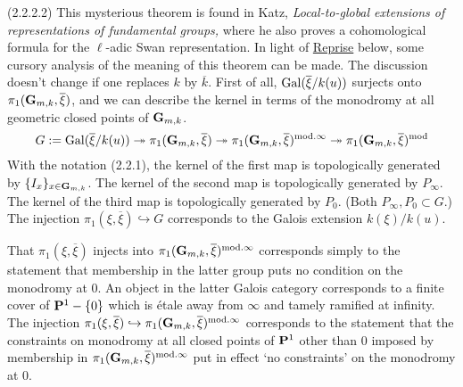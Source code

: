 \documentclass[deligne.tex]{subfiles}
\begin{document}
(2.2.2.2) This mysterious theorem is found in Katz,
\emph{Local-to-global extensions of representations of fundamental groups,}
where he also proves a cohomological formula for the $\ell$-adic Swan
representation.
In light of \hyperref[laumon:reprise]{Reprise} below, some cursory analysis
of the meaning of this theorem can be made.
The discussion doesn't change if one replaces $k$ by $\overline k$.
First of all, $\operatorname{Gal}(\overline\xi/k(u))$ surjects onto
$\pi_1(\mathbf{G}_{m,k},\overline\xi)$, and we can describe the kernel in terms of
the monodromy at all geometric closed points of $\mathbf{G}_{m,k}$.
\begin{equation*}
	G:=\operatorname{Gal}(\overline\xi/k(u))
	\twoheadrightarrow\pi_1(\mathbf{G}_{m,k},\overline\xi)
	\twoheadrightarrow\pi_1(\mathbf{G}_{m,k},\overline\xi)^{\mathrm{mod}.\infty}
	\twoheadrightarrow\pi_1(\mathbf{G}_{m,k},\overline\xi)^{\mathrm{mod}}
\end{equation*}
With the notation (2.2.1),
the kernel of the first map is topologically generated by
$\{I_x\}_{x\in\mathbf{G}_{m,k}}$.
The kernel of the second map is topologically generated by $P_{\infty}$.
The kernel of the third map is topologically generated by $P_0$.
(Both $P_\infty,P_0\subset G$.)
The injection $\pi_1(\xi,\overline\xi)\hookrightarrow G$ corresponds to the
Galois extension $k(\xi)/k(u)$.

That $\pi_1(\xi,\overline\xi)$ injects into
$\pi_1(\mathbf{G}_{m,k},\overline\xi)^{\mathrm{mod}.\infty}$
corresponds simply to the statement that membership in the latter group
puts no condition on the monodromy at 0. An object in the latter Galois
category corresponds to a finite cover of $\mathbf{P}^1-\{0\}$ which is étale away
from $\infty$ and tamely ramified at infinity. The injection
$\pi_1(\xi,\overline\xi)\hookrightarrow\pi_1(\mathbf{G}_{m,k},\overline\xi)^{\mathrm{mod}.\infty}$
corresponds to the statement that the constraints on monodromy at all 
closed points of $\mathbf{P}^1$ other than 0 imposed by membership in 
$\pi_1(\mathbf{G}_{m,k},\overline\xi)^{\mathrm{mod}.\infty}$ put in effect
`no constraints' on the monodromy at 0.
\end{document}

